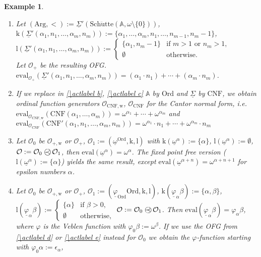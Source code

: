 \documentclass[10pt]{article}
\def \ssubitem#1{\item \label{\actlabel#1} }
\def \refsub#1#2{\ref{#1#2}}                    %
\def \refact#1{\ref{\actlabel#1}}               %
\def\mycases#1{\begin{cases}#1\end{cases}}
\newtheorem {example}[lemma]{Example}
\def \calO{{\mathcal O}}
\def\Arg{\mathrm{Arg}}
\def\k{\mathrm{k}}
\def\lrm{\mathrm{l}}
\def\eval{\mathrm{eval}}
\def\omegabar{{\underline{\omega}}}
\def\phibar{{\underline{\varphi}}}
\def\schuette{\mathrm{Sch\ddot{u}tte}}
\def\APN{\mathbb{A}}
\def\CNF{\mathrm{CNF}}
\def\wrm{\mathrm{w}}
\def\preccirc{\mathrel{\bigcirc \kern-12pt \prec}} %
\def\Ord{\mathrm{Ord}}
\def\Sigmabar{\underline{\Sigma}}
\begin{document}
\begin{example}
{\begin{enumerate}
Let $\calO_{+,\wrm}$ be the resulting OFG. Then one easily
verifies $\eval(\Sigmabar()) = 0$ (similar cases occurring
in future examples will  not be mentioned below)
$\eval(\Sigmabar(\alpha_1 ,\ldots, \alpha_m)) = 
\alpha_1 +\cdots + \alpha_m$ for $m>0$. 
The fixed point free version of it, i.e. $\lrm(t) := \k(t)$ yields
the same result, except 
$\eval(\Sigmabar(\alpha,\underbrace{1 ,\ldots, 1}_{l}))= 
\alpha + l+1$
\ssubitem c Let $(\Arg,<):= \Sigmabar'(\schuette(\APN,\omega \setminus \{ 0 \} ))$,\\
$\k(\Sigmabar'(\alpha_1,n_1 ,\ldots, \alpha_m,n_m)):=
\{ \alpha_1 ,\ldots, \alpha_m,n_1,\ldots, n_{m-1},n_m-1 \}$,\\
$\lrm(\Sigmabar'(\alpha_1,n_1 ,\ldots, \alpha_m,n_m)):=
\mycases{\{ \alpha_1,n_m-1\} &
\text{if $m>1$ or $n_m> 1$,}\\ \emptyset&\text{otherwise.}}$\\
Let $\calO_+$ be the resulting OFG. 
$\eval_{\calO_+}(\Sigmabar'(\alpha_1,n_1 ,\ldots, \alpha_m,n_m)) = 
(\alpha_1 \cdot n_1) +\cdots+ (\alpha_m \cdot n_m)$.
\ssubitem d If we replace in \refact b, \refact c 
$\APN$ by $\Ord$ and $\Sigmabar$ by $\CNF$, we obtain
ordinal function generators $\calO_{\CNF,\wrm}$,
$\calO_{\CNF}$ for the 
Cantor normal form, i.e. $\eval_{\calO_{\CNF,\wrm}}
(\CNF(\alpha_1 ,\ldots, \alpha_m)) = 
\omega^{\alpha_1} +\cdots+ \omega^{\alpha_m}$
and 
$\eval_{\calO_{\CNF}}
(\CNF'(\alpha_1 ,n_1,\ldots, \alpha_m,n_m)) = 
\omega^{\alpha_1}\cdot n_1  +\cdots+ \omega^{\alpha_m} \cdot n_m$
\ssubitem e Let 
$\calO_0$ be $\calO_{+,\wrm}$ or $\calO_+$,
$\calO_1:= (\omegabar^\Ord,\k,\lrm)$ with
$\k(\omegabar^\alpha):= \{ \alpha \}$,
$\lrm(\omegabar^\alpha):= \emptyset$,
$\calO:= \calO_0 \preccirc \calO_1$,
then $\eval(\omegabar^\alpha)= \omega^\alpha$. 
The fixed point free version ($\lrm(\omegabar^\alpha):= \{ \alpha \}$)
yields the same result, except
$\eval(\omegabar^{\alpha +n})= \omega^{\alpha+n+1}$ for 
epsilon numbers $\alpha$.
\ssubitem f Let 
$\calO_0$ be $\calO_{+,\wrm}$ or $\calO_+$,
$\calO_1:= (\phibar_\Ord\Ord,\k,\lrm)$,
$\k(\phibar_\alpha \beta):= \{ \alpha,\beta \}$,\\
$\lrm(\phibar_\alpha \beta):= 
\mycases{\{ \alpha \} &\text{if $\beta > 0 $,} \\
\emptyset&\text{otherwise,}}$
$\calO:= \calO_0 \preccirc \calO_1$.
Then $\eval(\phibar_\alpha \beta) = \varphi_\alpha \beta$,
where $\varphi$ is the Veblen function with $\varphi_0 \beta:= \omega^\beta$.
If we use the OFG from \refact d or \refact e instead for $\calO_0$ we 
obtain the $\varphi$-function starting with $\varphi_0 \alpha:= \epsilon_\alpha$,

\end{enumerate}}
\end{example}
\end{document}
